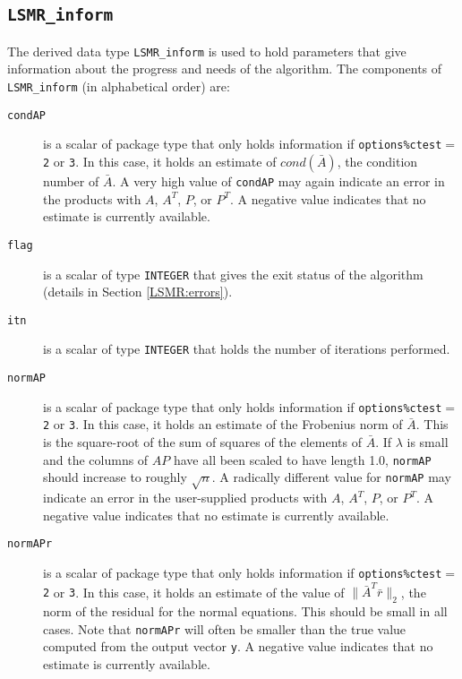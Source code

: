 
\subsection{\texttt{LSMR\_inform}}
\label{LSMR:type:inform}
The derived data type {\tt LSMR\_inform}
is used to hold parameters that give information about the progress and needs
of the algorithm. The components of {\tt LSMR\_inform}
(in alphabetical order) are:

\begin{description}

\item[\texttt{condAP}]  is a scalar of package type that
     only holds information if {\tt options\%ctest}$ =${\tt 2} or {\tt 3}.
     In this case, it holds an estimate of $cond(\bar{A})$, the condition
     number of $\bar{A}$.  A very high value of {\tt condAP}
     may again indicate an error in the products 
     with $A$, $A^T$, $P$, or $P^T$. A negative value indicates
     that no estimate is currently available.

\item[\texttt{flag}] is a scalar of type  {\tt INTEGER}
that gives the exit status of the algorithm (details in Section \ref{LSMR:errors}).

\item[\texttt{itn}] is a scalar of type  {\tt INTEGER} that holds the number
of iterations performed.

\item[\texttt{normAP}]  is a scalar of package type that
     only holds information if {\tt options\%ctest}$ =${\tt 2} or {\tt 3}.
     In this case, it holds an estimate of the Frobenius norm of $\bar{A}$.
     This is the square-root of the sum of squares of the elements of $\bar{A}$.
     If $\lambda$ is small and the columns of $AP$ have all been scaled to have 
     length 1.0, {\tt normAP} should increase to roughly $\sqrt{n}$.
     A radically different value for {\tt normAP} may
     indicate an error in the user-supplied
     products with $A$, $A^T$, $P$, or $P^T$. A negative value
     indicates that no estimate is currently available.

\item[\texttt{normAPr}]  is a scalar of package type that
     only holds information if {\tt options\%ctest}$ =${\tt 2} or {\tt 3}.
     In this case, it holds an estimate of the  value of
     $\| \bar{A}^T\bar{r}\|_2$, the norm of the residual for the normal equations.
     This should be small in all cases.  Note that {\tt normAPr}  will often be smaller 
     than the true value computed from the output vector {\tt y}. A negative value
     indicates that no estimate is currently available.
    

\end{description}
